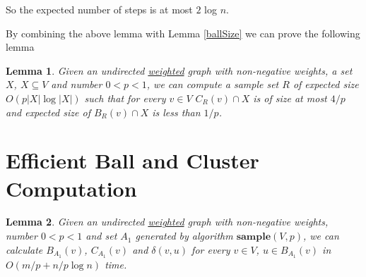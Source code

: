\documentclass[shortabstract, lic, english]{iithesis}
\theoremstyle{definition} \newtheorem{definition}{Definition}[chapter]
\theoremstyle{plain} \newtheorem{remark}[definition]{Observation}
\theoremstyle{plain} \newtheorem{theorem}[definition]{Theorem}
\theoremstyle{plain} \newtheorem{lemma}[definition]{Lemma}
\theoremstyle{plain} \newtheorem{conjecture}[definition]{Conjecture}
\begin{document}
So the expected number of steps is at most $2$ log $n$.

By combining the above lemma with Lemma \ref{ballSize} we can prove the following lemma

\begin{lemma} \label{sampleAlg}
    Given an undirected \underline{weighted} graph with non-negative weights, a set $X$, $X \subseteq V$ and number $0 < p < 1$, we can compute a sample set
    $R$ of expected size $O(p|X|\log|X|)$ such that for every $v \in V$ $C_R(v) \cap X$ is of size at most $4/p$ and expected size of $B_R(v) \cap X$ is less than $1/p$.
\end{lemma}


\section{Efficient Ball and Cluster Computation}

\begin{lemma} \label{ballClusterComputation}
    Given an undirected \underline{weighted} graph with non-negative weights, number $0 < p < 1$ and set $A_1$ generated by algorithm $\mathbf{sample}(V, p)$,
    we can calculate $B_{A_1}(v)$, $C_{A_1}(v)$ and $\delta(v,u)$ for every $v \in V$, $u \in B_{A_1}(v)$ in $O(m/p + n/p \log n)$ time.
\end{lemma}
\end{document}
